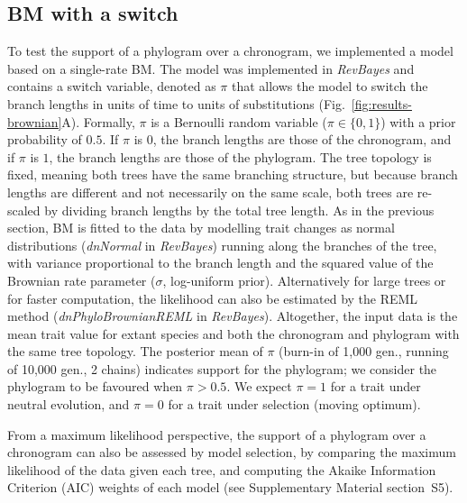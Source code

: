 \documentclass{article}
\newcommand{\PhyloSupport}{\pi}
\begin{document}
\subsection*{BM with a switch}
To test the support of a phylogram over a chronogram, we implemented a model based on a single-rate BM.
The model was implemented in \textit{RevBayes} and contains a switch variable, denoted as $\PhyloSupport$ that allows the model to switch the branch lengths in units of time to units of substitutions (Fig.~\ref{fig:results-brownian}A).
Formally, $\PhyloSupport$ is a Bernoulli random variable ($\PhyloSupport \in \{0, 1\}$) with a prior probability of $0.5$.
If $\PhyloSupport$ is $0$, the branch lengths are those of the chronogram, and if $\PhyloSupport$ is $1$, the branch lengths are those of the phylogram.
The tree topology is fixed, meaning both trees have the same branching structure, but because branch lengths are different and not necessarily on the same scale, both trees are re-scaled by dividing branch lengths by the total tree length.
As in the previous section, BM is fitted to the data by modelling trait changes as normal distributions (\textit{dnNormal} in \textit{RevBayes}) running along the branches of the tree, with variance proportional to the branch length and the squared value of the Brownian rate parameter ($\sigma$, log-uniform prior).
Alternatively for large trees or for faster computation, the likelihood can also be estimated by the REML method (\textit{dnPhyloBrownianREML} in \textit{RevBayes}).
Altogether, the input data is the mean trait value for extant species and both the chronogram and phylogram with the same tree topology.
The posterior mean of $\PhyloSupport$ (burn-in of 1,000 gen., running of 10,000 gen., 2 chains) indicates support for the phylogram; we consider the phylogram to be favoured when $\PhyloSupport > 0.5$.
We expect $\PhyloSupport = 1$ for a trait under neutral evolution, and $\PhyloSupport = 0$ for a trait under selection (moving optimum).

From a maximum likelihood perspective, the support of a phylogram over a chronogram can also be assessed by model selection, by comparing the maximum likelihood of the data given each tree, and computing the Akaike Information Criterion (AIC) weights of each model (see Supplementary Material section~S5).
\end{document}
